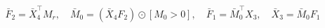 \documentclass{article}
\begin{document}
\begin{preview}

\[ \bar F_2 = \bar X_4^\top M_r,\quad \bar M_0 = (\bar X_4 F_2) \odot [M_0 > 0],\quad \bar F_1 = \bar M_0^\top X_3,\quad \bar X_3 = \bar M_0 F_1 \]

\end{preview}
\end{document}
